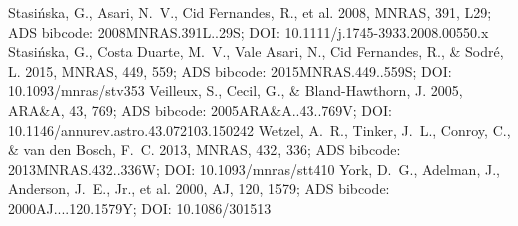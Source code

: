 \documentclass[twocolumn]{aastex631}
\begin{document}
\begin{thebibliography}{}
 Stasi{\'n}ska, G., Asari, N.~V., Cid Fernandes, R., et al. 2008, MNRAS, 391, L29; ADS bibcode: 2008MNRAS.391L..29S; DOI: 10.1111/j.1745-3933.2008.00550.x
 Stasi{\'n}ska, G., Costa Duarte, M.~V., Vale Asari, N., Cid Fernandes, R., \& Sodr{\'e}, L. 2015, MNRAS, 449, 559; ADS bibcode: 2015MNRAS.449..559S; DOI: 10.1093/mnras/stv353
 Veilleux, S., Cecil, G., \& Bland-Hawthorn, J. 2005, ARA\&A, 43, 769; ADS bibcode: 2005ARA\&A..43..769V; DOI: 10.1146/annurev.astro.43.072103.150242
 Wetzel, A.~R., Tinker, J.~L., Conroy, C., \& van den Bosch, F.~C. 2013, MNRAS, 432, 336; ADS bibcode: 2013MNRAS.432..336W; DOI: 10.1093/mnras/stt410
 York, D.~G., Adelman, J., Anderson, J.~E., Jr., et al. 2000, AJ, 120, 1579; ADS bibcode: 2000AJ....120.1579Y; DOI: 10.1086/301513
\end{thebibliography}
\end{document}
